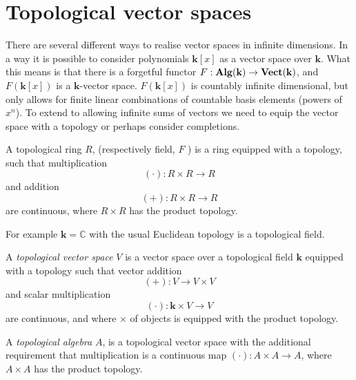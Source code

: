 
    \section{Topological vector spaces}
    
        There are several different ways to realise vector spaces in infinite dimensions. In a way it is possible to consider polynomials \( \mathbf{k}[x]\) as a vector space over \( \mathbf{k}\).
        What this means is that there is a forgetful functor \( F : \mathbf{Alg}(\mathbf{k}) \rightarrow \mathbf{Vect}(\mathbf{k} )\), and \( F(\mathbf{k}[x])\) is a \(\mathbf{k}\)-vector space. \(F(\mathbf{k}[x])\) is countably infinite dimensional, but only allows for finite linear combinations of countable basis elements (powers of \(x^n\)). To extend to allowing infinite sums of vectors we need to equip the vector space with a topology or perhaps consider completions.
        
        \begin{defn} A topological ring \(R\), (respectively field, \(F\) ) is a ring equipped with a topology, such that multiplication \[ (\cdot)  : R \times R \rightarrow R\] and addition \[ (+) : R \times R \rightarrow R\] are continuous, where \( R \times R\) has the product topology. 
        \end{defn}
        
        For example \( \mathbf{k} = \mathbb{C}\) with the usual Euclidean topology is a topological field.
        
        \begin{defn} 
        \label{defn:topologicalvectspace}
        A \emph{topological vector space} \(V\) is a vector space over a topological field \( \mathbf{k}\) equipped with a topology such that vector addition 
        \[ (+) : V \rightarrow V \times V\] and
        scalar multiplication
        \[ (\cdot) : \mathbf{k} \times V \rightarrow V\]
        are continuous, and where \( \times\) of objects is equipped with the product topology.
        \end{defn}
        
        \begin{defn} A \emph{topological algebra} \(A\), is a topological vector space with the additional requirement that multiplication is a continuous map 
        \( (\cdot) : A \times A \rightarrow A\), where \( A \times A\) has the product topology.
        \end{defn}
        
